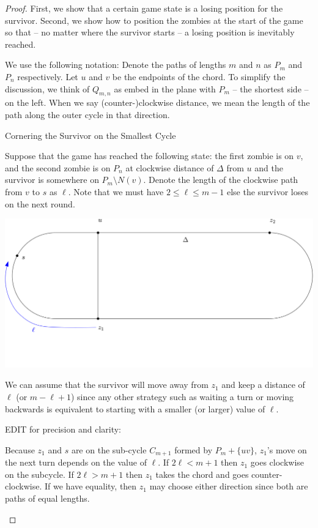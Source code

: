 \documentclass[letterpaper, 10pt]{article}
\begin{document}
\begin{proof}
First, we show that a certain game state is a losing position for the survivor.
Second, we show how to position the zombies at the start of the game so that --
no matter where the survivor starts -- a losing position is inevitably reached.

We use the following notation:
Denote the paths of lengths $m$ and $n$ as $P_m$ and $P_n$ respectively.
Let $u$ and $v$ be the endpoints of the chord.
To simplify the discussion, we think of $Q_{m,n}$ as embed in the plane with $P_m$ -- the
shortest side -- on the left.
When we say (counter-)clockwise distance, we mean the length of the path
along the outer cycle in that direction.

\begin{proofpart} Cornering the Survivor on the Smallest Cycle

Suppose that the game has reached the following state:
the first zombie is on $v$, and the second
zombie is on $P_n$ at clockwise distance of $\Delta$ from $u$ and the survivor
is somewhere on $P_m \setminus N(v)$. Denote the length of the clockwise
path from $v$ to $s$ as $\ell$. Note that we must have $2 \leq \ell \leq m-1$ else the survivor loses on the next round.

\begin{center}
 \includegraphics[scale=0.20]{diagram1}
\end{center}

We can assume that the survivor will move away from
$z_1$ and keep a distance of $\ell$ (or $m-\ell +1$) since any other strategy such as waiting a turn or moving backwards is
equivalent to starting with a smaller (or larger) value of $\ell$.

EDIT for precision and clarity:

Because $z_1$ and $s$ are on the sub-cycle $C_{m+1}$ formed by
$P_m + \{uv\}$, $z_1$'s move on the next turn depends on the
value of $\ell$. If $2\ell < m+1$ then $z_1$ goes clockwise
on the subcycle. If $2\ell > m+1$ then $z_1$ takes the chord and
goes counter-clockwise.  If we have equality, then $z_1$ may
choose either direction since both are paths of equal lengths.


\end{proofpart}
\end{proof}
\end{document}
